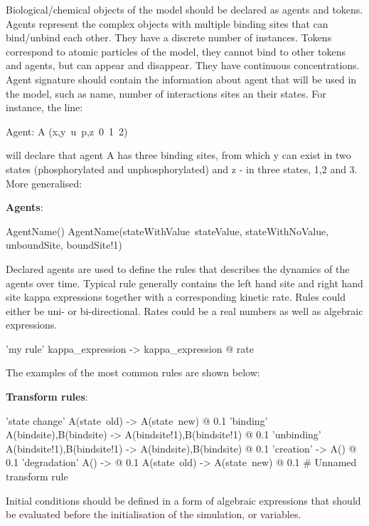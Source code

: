 Biological/chemical objects of the model should be declared as agents and tokens. Agents represent the complex objects with multiple binding sites that can bind/unbind each other. They have a discrete number of instances. Tokens correspond to atomic particles of the model, they cannot bind to other tokens and agents, but can appear and disappear. They have continuous concentrations. 
Agent signature should contain the information about agent that will be used in the model, such as name, number of interactions sites an their states. For instance, the line:

\begin{kappasource}
Agent: A (x,y~u~p,z~0~1~2) 
\end{kappasource}

will declare that agent A has three binding sites, from which y can exist in two states (phosphorylated and unphosphorylated) and z - in three states, 1,2 and 3.
More generalised:

\textbf{Agents}:

\begin{kappasource}
AgentName()
AgentName(stateWithValue~stateValue, stateWithNoValue, unboundSite, boundSite!1)
\end{kappasource} 

Declared agents are used to define the rules that describes the dynamics of the agents over time. Typical rule generally contains the left hand site and right hand site kappa expressions together with a corresponding kinetic rate. Rules could either be uni- or bi-directional. Rates could be a real numbers as well as algebraic expressions.

\begin{kappasource}
'my rule' kappa_expression -> kappa_expression @ rate
\end{kappasource}

The examples of the most common rules are shown below:


\textbf{Transform rules}:

\begin{kappasource}
'state change' A(state~old) -> A(state~new) @ 0.1
'binding'      A(bindsite),B(bindsite) -> A(bindsite!1),B(bindsite!1) @ 0.1
'unbinding'    A(bindsite!1),B(bindsite!1) -> A(bindsite),B(bindsite) @ 0.1
'creation'     -> A() @ 0.1
'degradation'  A() -> @ 0.1
A(state~old) -> A(state~new) @ 0.1 # Unnamed transform rule
\end{kappasource} 

Initial conditions should be defined in a form of algebraic expressions that should be evaluated before the initialisation of the simulation, or variables.

